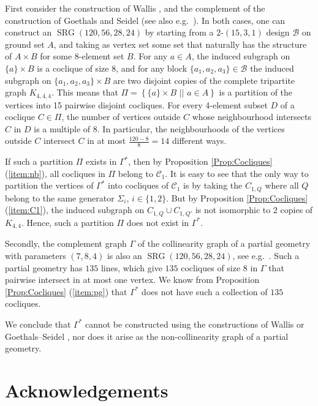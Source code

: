 \documentclass[a4paper]{article}
\theoremstyle{definition}
\newcommand{\sett}[2]{ \left\{ #1 \, \, || \, \, #2 \right \} }
\newcommand{\mb}{\mathcal B}
\newcommand{\mc}{\mathcal C}
\DeclareMathOperator{\SRG}{SRG}
\begin{document}
First consider the construction of Wallis \cite[Theorem 1]{Wallis}, \cite{WallisCorr} and the complement of the construction of Goethals and Seidel \cite[Theorem 2.4]{Goethals:Seidel} (see also e.g.\ \cite[\S 8.C]{Brouwer:VanLint}).
In both cases, one can construct an $\SRG(120,56,28,24)$ by starting from a $2$-$(15,3,1)$ design $\mb$ on ground set $A$, and taking as vertex set some set that naturally has the structure of $A \times B$ for some $8$-element set $B$.
For any $a \in A$, the induced subgraph on $\{a\} \times B$ is a coclique of size $8$, and for any block $\{a_1,a_2,a_3\} \in \mb$ the induced subgraph on $\{a_1,a_2,a_3\} \times B$ are two disjoint copies of the complete tripartite graph $K_{4,4,4}$.
This means that $\Pi = \sett{\{a\} \times B}{a \in A}$ is a partition of the vertices into 15 pairwise disjoint cocliques.
For every 4-element subset $D$ of a coclique $C \in \Pi$, the number of vertices outside $C$ whose neighbourhood intersects $C$ in $D$ is a multiple of $8$.
In particular, the neighbourhoods of the vertices outside $C$ intersect $C$ in at most $\frac{120-8}8 = 14$ different ways.

If such a partition $\Pi$ exists in $\Gamma^*$, then by Proposition \ref{Prop:Cocliques} (\ref{item:nb}), all cocliques in $\Pi$ belong to $\mc_1$.
It is easy to see that the only way to partition the vertices of $\Gamma^*$ into cocliques of $\mc_1$ is by taking the $C_{1,Q}$ where all $Q$ belong to the same generator $\Sigma_i$, $i \in \{1,2\}$.
But by Proposition \ref{Prop:Cocliques} (\ref{item:C1}), the induced subgraph on $C_{1,Q} \cup C_{1,Q'}$ is not isomorphic to 2 copies of $K_{4,4}$.
Hence, such a partition $\Pi$ does not exist in $\Gamma^*$.

Secondly, the complement graph $\Gamma$ of the collinearity graph of a partial geometry with parameters $(7,8,4)$ is also an $\SRG(120,56,28,24)$, see e.g.\ \cite[\S 8.6]{Brouwer:VanMaldeghem}.
Such a partial geometry has $135$ lines, which give $135$ cocliques of size $8$ in $\Gamma$ that pairwise intersect in at most one vertex.
We know from Proposition \ref{Prop:Cocliques} (\ref{item:pg}) that $\Gamma^*$ does not have such a collection of $135$ cocliques.

We conclude that $\Gamma^*$ cannot be constructed using the constructions of Wallis \cite{Wallis} or Goethals--Seidel \cite{Goethals:Seidel}, nor does it arise as the non-collinearity graph of a partial geometry.

\section*{Acknowledgements}
\end{document}
